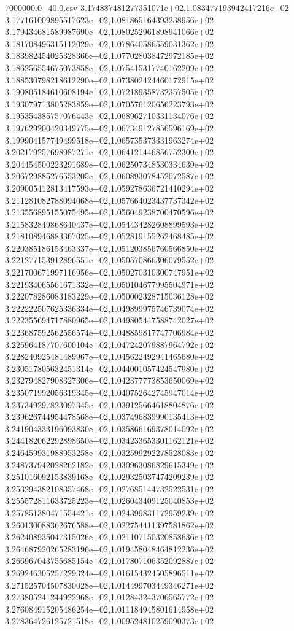 \begin{filecontents*}{7000000.0_40.0.csv}
3.174887481277351071e+02,1.083477193942417216e+02
3.177161009895517623e+02,1.081865164393238956e+02
3.179434681589987690e+02,1.080252961898941066e+02
3.181708496315112029e+02,1.078640586559031362e+02
3.183982454025328366e+02,1.077028038472972185e+02
3.186256554675073858e+02,1.075415317740162209e+02
3.188530798218612290e+02,1.073802424460172915e+02
3.190805184610608194e+02,1.072189358732357505e+02
3.193079713805283859e+02,1.070576120656223793e+02
3.195354385757076443e+02,1.068962710331134076e+02
3.197629200420349775e+02,1.067349127856596169e+02
3.199904157749499518e+02,1.065735373331963274e+02
3.202179257698987271e+02,1.064121446856752300e+02
3.204454500223291689e+02,1.062507348530334639e+02
3.206729885276553205e+02,1.060893078452072587e+02
3.209005412813417593e+02,1.059278636721410294e+02
3.211281082788094068e+02,1.057664023437737342e+02
3.213556895155075495e+02,1.056049238700470596e+02
3.215832849868640437e+02,1.054434282608899593e+02
3.218108946883367025e+02,1.052819155262468485e+02
3.220385186153463337e+02,1.051203856760566850e+02
3.221277153912896551e+02,1.050570866306079552e+02
3.221700671997116956e+02,1.050270310300747951e+02
3.221934065561671332e+02,1.050104677995504971e+02
3.222078286083183229e+02,1.050002328715036128e+02
3.222222507625336334e+02,1.049899975746739074e+02
3.222355694717880965e+02,1.049805447588742027e+02
3.223687592562556574e+02,1.048859817747706984e+02
3.225964187707600104e+02,1.047242079887964792e+02
3.228240925481489967e+02,1.045622492941465680e+02
3.230517805632451314e+02,1.044001057424547980e+02
3.232794827908327306e+02,1.042377773853650069e+02
3.235071992056319345e+02,1.040752642745947014e+02
3.237349297823097345e+02,1.039125664618804876e+02
3.239626744954478568e+02,1.037496839990135413e+02
3.241904333196093830e+02,1.035866169378014092e+02
3.244182062292898650e+02,1.034233653301162121e+02
3.246459931988953258e+02,1.032599292278528083e+02
3.248737942028262182e+02,1.030963086829615349e+02
3.251016092153839168e+02,1.029325037474209239e+02
3.253294382108357468e+02,1.027685144732522531e+02
3.255572811633725223e+02,1.026043409125040853e+02
3.257851380471554421e+02,1.024399831172959239e+02
3.260130088362676588e+02,1.022754411397581862e+02
3.262408935047315026e+02,1.021107150320858636e+02
3.264687920265283196e+02,1.019458048464812236e+02
3.266967043755685154e+02,1.017807106352092887e+02
3.269246305257229324e+02,1.016154324505896511e+02
3.271525704507830028e+02,1.014499703449346271e+02
3.273805241244922968e+02,1.012843243706565772e+02
3.276084915205486254e+02,1.011184945801614958e+02
3.278364726125721518e+02,1.009524810259090373e+02

\end{filecontents*}
